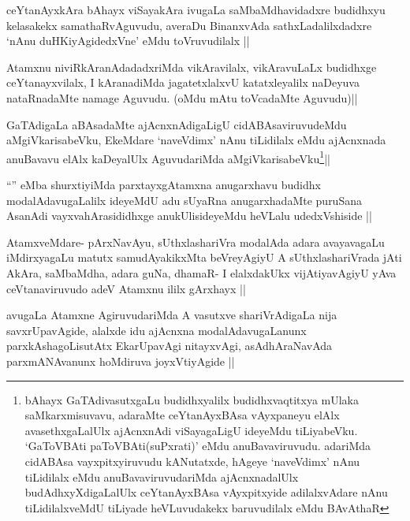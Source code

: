 \begin{artha}
ceYtanAyxkAra bAhayx viSayakAra ivugaLa saMbaMdhavidadxre budidhxyu kelasakekx samathaRvAguvudu, averaDu BinanxvAda sathxLadalilxdadxre `nAnu duHKiyAgidedxVne' eMdu toVruvudilalx ||
\end{artha}

\begin{artha}
Atamxnu niviRkAranAdadadxriMda vikAravilalx, vikAravuLaLx budidhxge ceYtanayxvilalx, I kAranadiMda jagatetxlalxvU katatxleyalilx naDeyuva nataRnadaMte namage Aguvudu. (oMdu mAtu toVcadaMte Aguvudu)||
\end{artha}

\begin{artha}
GaTAdigaLa aBAsadaMte ajAcnxnAdigaLigU cidABAsaviruvudeMdu aMgiVkarisabeVku, EkeMdare `naveVdimx' nAnu tiLidilalx eMdu ajAcnxnada anuBavavu elAlx kaDeyalUlx AguvudariMda aMgiVkarisabeVku\footnote{bAhayx GaTAdivasutxgaLu budidhxyalilx budidhxvaqtitxya mUlaka saMkarxmisuvavu, adaraMte ceYtanAyxBAsa vAyxpaneyu elAlx avasethxgaLalUlx ajAcnxnAdi viSayagaLigU ideyeMdu tiLiyabeVku. `GaToVBAti paToVBAti(suPxrati)' eMdu anuBavaviruvudu. adariMda cidABAsa vayxpitxyiruvudu kANutatxde, hAgeye `naveVdimx' nAnu tiLidilalx eMdu anuBavaviruvudariMda ajAcnxnadalUlx budAdhxyXdigaLalUlx ceYtanAyxBAsa vAyxpitxyide adilalxvAdare nAnu tiLidilalxveMdU tiLiyade heVLuvudakekx baruvudilalx eMdu BAvAthaR}||
\end{artha}

\begin{artha}
``\stext'' eMba shurxtiyiMda parxtayxgAtamxna anugarxhavu budidhx modalAdavugaLalilx ideyeMdU adu sUyaRna anugarxhadaMte puruSana AsanAdi vayxvahArasididhxge anukUlisideyeMdu heVLalu udedxVshiside ||
\end{artha}

\begin{artha}
AtamxveMdare- pArxNavAyu, sUthxlashariVra modalAda adara avayavagaLu iMdirxyagaLu matutx samudAyakikxMta beVreyAgiyU A sUthxlashariVrada jAti AkAra, saMbaMdha, adara guNa, dhamaR- I elalxdakUkx vijAtiyavAgiyU yAva ceVtanaviruvudo adeV Atamxnu ililx gArxhayx ||
\end{artha}

\begin{artha}
avugaLa Atamxne AgiruvudariMda A vasutxve shariVrAdigaLa nija savxrUpavAgide, alalxde idu ajAcnxna modalAdavugaLanunx parxkAshagoLisutAtx EkarUpavAgi nitayxvAgi, asAdhAraNavAda parxmANAvanunx hoMdiruva joyxVtiyAgide ||
\end{artha}


